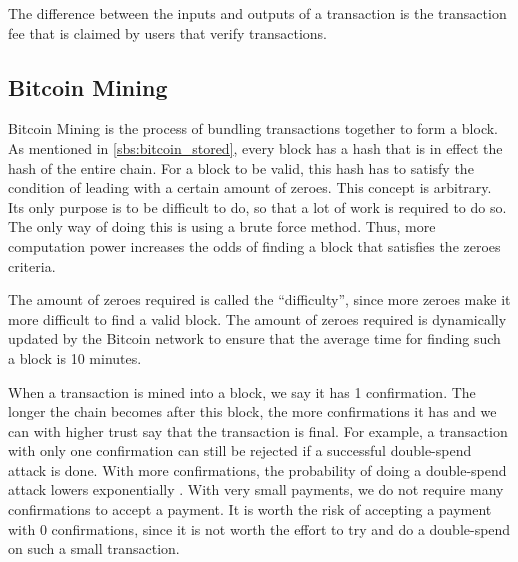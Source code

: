 The difference between the inputs and outputs of a transaction is the transaction fee that is claimed by users that verify transactions. 

\subsection{Bitcoin Mining}

Bitcoin Mining is the process of bundling transactions together to form a block. As mentioned in \ref{sbs:bitcoin_stored}, every block has a hash that is in effect the hash of the entire chain. For a block to be valid, this hash has to satisfy the condition of leading with a certain amount of zeroes. This concept is arbitrary. Its only purpose is to be difficult to do, so that a lot of work is required to do so. The only way of doing this is using a brute force method. Thus, more computation power increases the odds of finding a block that satisfies the zeroes criteria.

The amount of zeroes required is called the ``difficulty'', since more zeroes make it more difficult to find a valid block. The amount of zeroes required is dynamically updated by the Bitcoin network to ensure that the average time for finding such a block is 10 minutes.

When a transaction is mined into a block, we say it has 1 confirmation. The longer the chain becomes after this block, the more confirmations it has and we can with higher trust say that the transaction is final. For example, a transaction with only one confirmation can still be rejected if a successful double-spend attack is done. With more confirmations, the probability of doing a double-spend attack lowers exponentially \cite{Nakamoto2008}. With very small payments, we do not require many confirmations to accept a payment. It is worth the risk of accepting a payment with 0 confirmations, since it is not worth the effort to try and do a double-spend on such a small transaction.




